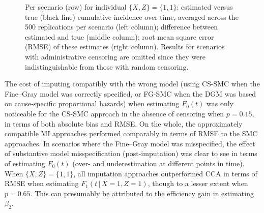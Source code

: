 \documentclass[
  letterpaper,
  DIV=11,
  numbers=noendperiod]{scrreprt}
\newcommand{\given}{\,|\,}
\begin{document}
\begin{figure}


\caption{\label{fig-preds-X1Z1}Per scenario (row) for individual
\(\{X,Z\} = \{1,1\}\): estimated versus true (black line) cumulative
incidence over time, averaged across the 500 replications per scenario
(left column); difference between estimated and true (middle column);
root mean square error (RMSE) of these estimates (right column). Results
for scenarios with administrative censoring are omitted since they were
indistinguishable from those with random censoring.}

\end{figure}%

The cost of imputing compatibly with the wrong model (using CS-SMC when
the Fine--Gray model was correctly specified, or FG-SMC when the DGM was
based on cause-specific proportional hazards) when estimating \(F_0(t)\)
was only noticeable for the CS-SMC approach in the absence of censoring
when \(p = 0.15\), in terms of both absolute bias and RMSE. On the
whole, the approximately compatible MI approaches performed comparably
in terms of RMSE to the SMC approaches. In scenarios where the
Fine--Gray model was misspecified, the effect of substantive model
misspecification (post-imputation) was clear to see in terms of
estimating \(F_0(t)\) (over- and underestimation at different points in
time). When \(\{X, Z\} = \{1, 1\}\), all imputation approaches
outperformed CCA in terms of RMSE when estimating
\(F_1(t \given X = 1, Z =1)\), though to a lesser extent when
\(p = 0.65\). This can presumably be attributed to the efficiency gain
in estimating \(\beta_2\).
\end{document}
